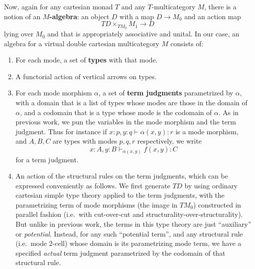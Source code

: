 \documentclass{article}
\let\types\vdash
\begin{document}
Now, again for any cartesian monad $T$ and any $T$-multicategory $M$, there is a notion of an \textbf{$M$-algebra}: an object $D$ with a map $D\to M_0$ and an action map
\[ T D \times_{T M_0} M_1 \to D \]
lying over $M_0$ and that is appropriately associative and unital.
In our case, an algebra for a virtual double cartesian multicategory $M$ consists of:
\begin{enumerate}
    \item For each mode, a set of \textbf{types} with that mode.
    \item A functorial action of vertical arrows on types.
    \item For each mode morphism $\alpha$, a set of \textbf{term judgments} parametrized by $\alpha$, with a domain that is a list of types whose modes are those in the domain of $\alpha$, and a codomain that is a type whose mode is the codomain of $\alpha$.
    As in previous work, we pun the variables in the mode morphism and the term judgment.
    Thus for instance if $x:p,y:q\types \alpha(x,y):r$ is a mode morphism, and $A,B,C$ are types with modes $p,q,r$ respectively, we write
    \[ x:A, y:B \types_{\alpha(x,y)} f(x,y) : C \]
    for a term judgment.
    \item An action of the structural rules on the term judgments, which can be expressed conveniently as follows.
    We first generate $T D$ by using ordinary cartesian simple type theory applied to the term judgments, with the parametrizing term of mode morphisms (the image in $T M_0$) constructed in parallel fashion (i.e.\ with cut-over-cut and structurality-over-structurality).
    But unlike in previous work, the terms in this type theory are just ``auxiliary'' or \emph{potential}.
    Instead, for any such ``potential term'', and any structural rule (i.e.\ mode 2-cell) whose domain is its parametrizing mode term, we have a specified \emph{actual} term judgment parametrized by the codomain of that structural rule.
    

\end{enumerate}
\end{document}

